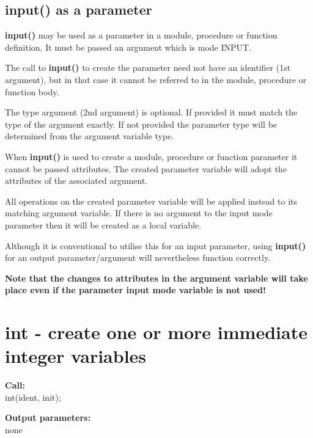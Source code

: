         \subsection{input() as a parameter}
        
            {\bf input()} may be used as a parameter in a module, procedure or
            function definition. It must be passed an argument which is mode INPUT.
            
            The call to {\bf input()} to create the parameter need not have an
            identifier (1st argument), but in that case it cannot be referred
            to in the module, procedure or function body.

            The type argument (2nd argument) is optional. If provided it must match
            the type of the argument exactly. If not provided the parameter type
            will be determined from the argument variable type.
        
            When {\bf input()} is used to create a module, procedure or function
            parameter it cannot be passed attributes. The created parameter
            variable will adopt the attributes of the associated argument.
            
            All operations on the created parameter variable will be applied instead
            to its matching argument variable. If there is no argument to the input
            mode parameter then it will be  created as a local variable.

            Although it is conventional to utilise this for an input parameter,
            using {\bf input()} for an output parameter/argument will nevertheless
            function correctly.

            {\bf Note that the changes to attributes in the argument variable will
            take place even if the parameter input mode variable is not used!}






    \section{int - create one or more immediate integer variables}\label{sec:ipint}
        
        {\bf Call:} \\
        int(ident, init);
        
        {\bf Output parameters:} \\
        none
        
